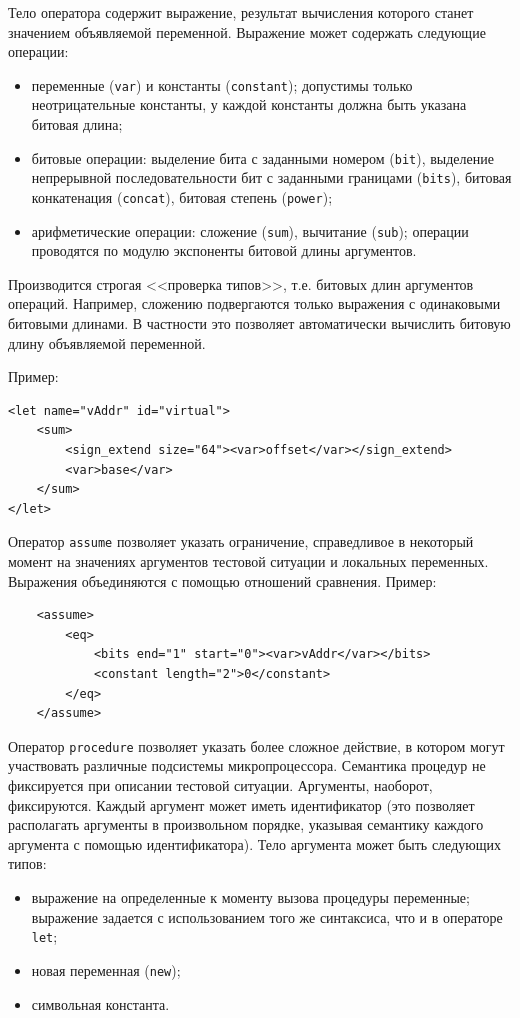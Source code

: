 Тело оператора содержит выражение, результат вычисления которого
станет значением объявляемой переменной. Выражение может содержать
следующие операции:
\begin{itemize}
  \item переменные (\texttt{var}) и константы (\texttt{constant});
  допустимы только неотрицательные константы, у каждой константы
  должна быть указана битовая длина;
  \item битовые операции: выделение бита с заданными номером (\texttt{bit}),
  выделение непрерывной последовательности бит с заданными границами
  (\texttt{bits}), битовая конкатенация (\texttt{concat}), битовая
  степень (\texttt{power});
  \item арифметические операции: сложение (\texttt{sum}), вычитание
  (\texttt{sub}); операции проводятся по модулю экспоненты битовой
  длины аргументов.
\end{itemize}
Производится строгая <<проверка типов>>, т.е. битовых длин
аргументов операций. Например, сложению подвергаются только
выражения с одинаковыми битовыми длинами. В частности это позволяет
автоматически вычислить битовую длину объявляемой переменной.

Пример: {\small
\begin{verbatim}
<let name="vAddr" id="virtual">
    <sum>
        <sign_extend size="64"><var>offset</var></sign_extend>
        <var>base</var>
    </sum>
</let>
\end{verbatim}}

Оператор \texttt{assume} позволяет указать ограничение, справедливое
в некоторый момент на значениях аргументов тестовой ситуации и
локальных переменных. Выражения объединяются с помощью отношений
сравнения. Пример: {\small
\begin{verbatim}
    <assume>
        <eq>
            <bits end="1" start="0"><var>vAddr</var></bits>
            <constant length="2">0</constant>
        </eq>
    </assume>
\end{verbatim}}

Оператор \texttt{procedure} позволяет указать более сложное
действие, в котором могут участвовать различные подсистемы
микропроцессора. Семантика процедур не фиксируется при описании
тестовой ситуации. Аргументы, наоборот, фиксируются. Каждый аргумент
может иметь идентификатор (это позволяет располагать аргументы в
произвольном порядке, указывая семантику каждого аргумента с помощью
идентификатора). Тело аргумента может быть следующих типов:
\begin{itemize}
  \item выражение на определенные к моменту вызова процедуры
  переменные; выражение задается с использованием того же
  синтаксиса, что и в операторе \texttt{let};
  \item новая переменная (\texttt{new});
  \item символьная константа.
\end{itemize}

